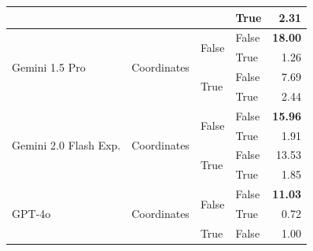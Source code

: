 \documentclass{article}
\begin{document}
\begin{table}
\begin{center}
{\begin{tabular}{@{}llllr@{}}
                                                                        &                                   &                           & True                      & 2.31 \\
    \midrule
    \multirow[c]{4}{*}{Gemini 1.5 Pro}                                  & \multirow[c]{4}{*}{Coordinates}   & \multirow[c]{2}{*}{False} & False                     & \textbf{18.00} \\
                                                                        &                                   &                           & True                      & 1.26 \\
                                                                        &                                   & \multirow[c]{2}{*}{True}  & False                     & 7.69 \\
                                                                        &                                   &                           & True                      & 2.44 \\
    \midrule
    \multirow[c]{4}{*}{Gemini 2.0 Flash Exp.}                           & \multirow[c]{4}{*}{Coordinates}   & \multirow[c]{2}{*}{False} & False                     & \textbf{15.96} \\
                                                                        &                                   &                           & True                      & 1.91  \\
                                                                        &                                   & \multirow[c]{2}{*}{True}  & False                     & 13.53 \\
                                                                        &                                   &                           & True                      & 1.85  \\
    \midrule
    \multirow[c]{4}{*}{GPT-4o}                                          & \multirow[c]{4}{*}{Coordinates}   & \multirow[c]{2}{*}{False} & False                     & \textbf{11.03} \\
                                                                        &                                   &                           & True                      & 0.72 \\
                                                                        &                                   & \multirow[c]{2}{*}{True}  & False                     & 1.00 \\

\end{tabular}}
\end{center}
\end{table}
\end{document}
